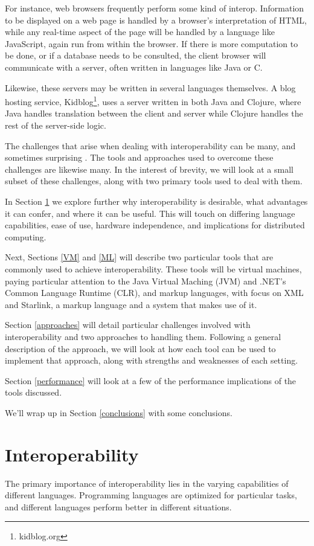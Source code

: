 \documentclass{sig-alternate}
\begin{document}
For instance, web browsers frequently perform some kind of interop. Information to be displayed on a web page is handled by a browser's interpretation of HTML, while any real-time aspect of the page will be handled by a language like JavaScript, again run from within the browser. If there is more computation to be done, or if a database needs to be consulted, the client browser will communicate with a server, often written in languages like Java or C.

Likewise, these servers may be written in several languages themselves. A blog hosting service, Kidblog\footnote{kidblog.org}, uses a server written in both Java and Clojure, where Java handles translation between the client and server while Clojure handles the rest of the server-side logic.

The challenges that arise when dealing with interoperability can be many, and sometimes surprising \cite{Chisnall:2013}. The tools and approaches used to overcome these challenges are likewise many. In the interest of brevity, we will look at a small subset of these challenges, along with two primary tools used to deal with them.

In Section \ref{Interop} we explore further why interoperability is desirable, what advantages it can confer, and where it can be useful. This will touch on differing language capabilities, ease of use, hardware independence, and implications for distributed computing.

Next, Sections \ref{VM} and \ref{ML} will describe two particular tools that are commonly used to achieve interoperability. These tools will be virtual machines, paying particular attention to the Java Virtual Maching (JVM) and .NET's Common Language Runtime (CLR), and markup languages, with focus on XML and Starlink, a markup language and a system that makes use of it.

Section \ref{approaches} will detail particular challenges involved with interoperability and two approaches to handling them. Following a general description of the approach, we will look at how each tool can be used to implement that approach, along with strengths and weaknesses of each setting.

Section \ref{performance} will look at a few of the performance implications of the tools discussed.

We'll wrap up in Section \ref{conclusions} with some conclusions.

\section{Interoperability}\label{Interop}
The primary importance of interoperability lies in the varying capabilities of different languages. Programming languages are optimized for particular tasks, and different languages perform better in different situations.
\end{document}
